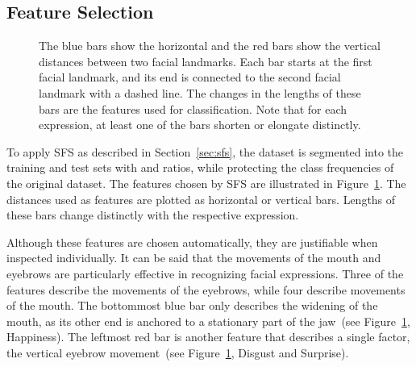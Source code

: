 \documentclass[hyperfootnotes=false]{article}
\begin{document}
\subsection{Feature Selection}

\begin{figure}
	\captionsetup[subfigure]{labelformat=empty}
	\centering	
	\vspace{-3mm}
	\caption{
		The blue bars show the horizontal and the red bars show the vertical distances between two facial landmarks.
		Each bar starts at the first facial landmark, and its end is connected to the second facial landmark with a dashed line.
		The changes in the lengths of these bars are the features used for classification.
		Note that for each expression, at least one of the bars shorten or elongate distinctly.}
	\label{fig:Features}
	\vspace{3mm}
\end{figure}

To apply SFS as described in Section~\ref{sec:sfs}, the dataset is segmented into the training and test sets with  and  ratios, while protecting the class frequencies of the original dataset.
The features chosen by SFS are illustrated in Figure~\ref{fig:Features}.
The distances used as features are plotted as horizontal or vertical bars.
Lengths of these bars change distinctly with the respective expression.

Although these features are chosen automatically, they are justifiable when inspected individually.
It can be said that the movements of the mouth and eyebrows are particularly effective in recognizing facial expressions.
Three of the features describe the movements of the eyebrows, while four describe movements of the mouth.
The bottommost blue bar only describes the widening of the mouth, as its other end is anchored to a stationary part of the jaw~(see Figure~\ref{fig:Features}, Happiness).
The leftmost red bar is another feature that describes a single factor, the vertical eyebrow movement~(see Figure~\ref{fig:Features}, Disgust and Surprise).
\end{document}
